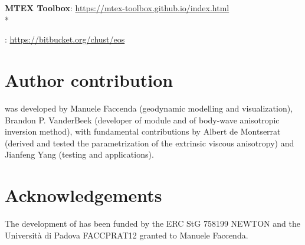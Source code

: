 \textbf{MTEX Toolbox}: \url{https://mtex-toolbox.github.io/index.html} \citep{mainprice2011gsl}\\*

\textbf{\mmaeostitle{}}: \url{https://bitbucket.org/chust/eos} \citep{chust2017jgr}

\section{Author contribution}
\thesistitle{} was developed by Manuele Faccenda (geodynamic modelling and visualization), Brandon P. VanderBeek (developer of \psitomotitle{} module and of body-wave anisotropic inversion method), with fundamental contributions by Albert de Montserrat (derived and tested the parametrization of the extrinsic viscous anisotropy) and Jianfeng Yang (testing and applications). 

\section{Acknowledgements}
The development of \thesistitle{} has been funded by the ERC StG 758199 NEWTON and the Università di Padova FACCPRAT12 granted to Manuele Faccenda.